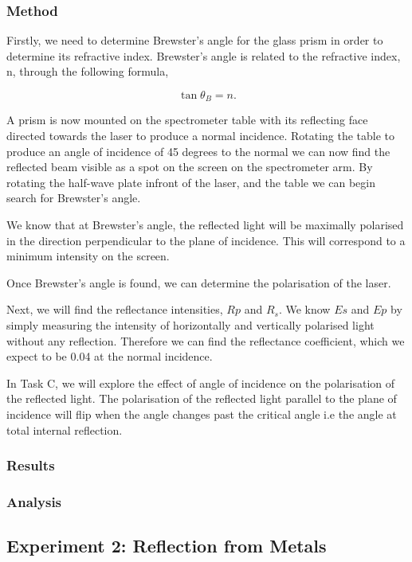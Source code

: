 \documentclass{article}
\begin{document}
\subsubsection{Method}
Firstly, we need to determine Brewster's angle for the glass prism in 
order to determine its refractive index. Brewster's angle is related 
to the refractive index, n, through the following formula,

\begin{equation}
    \tan{\theta_{B}} = n.
\end{equation}

A prism is now mounted on the spectrometer table with its reflecting 
face directed towards the laser to produce a normal incidence. Rotating 
the table to produce an angle of incidence of 45 degrees to the normal we 
can now find the reflected beam visible as a spot on the screen on the 
spectrometer arm. By rotating the half-wave plate infront of the laser, 
and the table we can begin search for Brewster's angle.

We know that at Brewster's angle, the reflected light will be maximally
polarised in the direction perpendicular to the plane of incidence. This 
will correspond to a minimum intensity on the screen.

Once Brewster's angle is found, we can determine the polarisation of the
laser.

Next, we will find the reflectance intensities, $R{p}$ and $R_{s}$. We 
know $E{s}$ and $E{p}$ by simply measuring the intensity of horizontally 
and vertically polarised light without any reflection. Therefore we can 
find the reflectance coefficient, which we expect to be 0.04 at the normal 
incidence.

In Task C, we will explore the effect of angle of incidence on the 
polarisation of the reflected light. The polarisation of the reflected 
light parallel to the plane of incidence will flip when the angle changes 
past the critical angle i.e the angle at total internal reflection.

\subsubsection{Results}
\subsubsection{Analysis}
\subsection{Experiment 2: Reflection from Metals}
\end{document}
